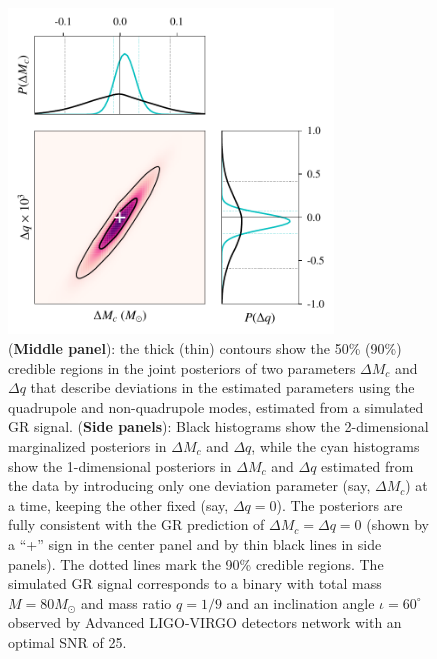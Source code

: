 \documentclass[prd,preprintnumbers,twocolumn,eqsecnum,floatfix,a4paper,nofootinbib,superscriptaddress]{revtex4}
\begin{document}
\begin{figure}[htb] \begin{center}
		\includegraphics[width=3.4in]{figs/hm_mcq_GR.pdf}
		\caption{(\textbf{Middle panel}): the thick (thin) contours show the 50\% (90\%) credible regions in the joint posteriors of two parameters $\Delta M_c$ and $\Delta q$ that describe deviations in the estimated parameters using the quadrupole and non-quadrupole modes, estimated from a simulated GR signal. (\textbf{Side panels}): Black histograms show the 2-dimensional marginalized posteriors in $\Delta M_c$ and $\Delta q$, while the cyan histograms show the 1-dimensional posteriors in $\Delta M_c$ and $\Delta q$ estimated from the data by introducing only one deviation parameter (say, $\Delta M_c$) at a time, keeping the other fixed (say, $\Delta q = 0$). The posteriors are fully consistent with the GR prediction of $\Delta M_c = \Delta q = 0$ (shown by a ``+'' sign in the center panel and by thin black lines in side panels). The dotted lines mark the 90\% credible regions. The simulated GR signal corresponds to a binary with total mass $M = {80}M_\odot$ and mass ratio $q = 1/9$ and an inclination angle $\iota = {60^\circ}$ observed by Advanced LIGO-VIRGO detectors network with an optimal SNR of 25. }
		\label{fig:posterior_BBH_GR_inj}
\end{center} \end{figure}
\end{document}
